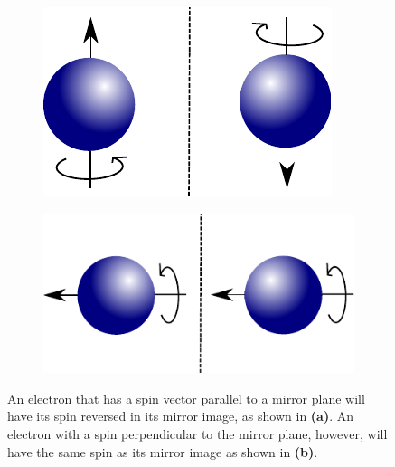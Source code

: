 \begin{figure}[h!]
\centering
\begin{subfigure}{.39\textwidth}
  \centering
  \includegraphics[width=1.0\linewidth]{Figures/UpDownSpinMirror}
  \caption{}
  \label{fig:UpDownSpinMirror}
\end{subfigure}%
\hspace{1cm}
\begin{subfigure}{.5\textwidth}
  \centering
  \includegraphics[width=1.0\linewidth]{Figures/LeftSpinMirror}
  \caption{}
  \label{fig:LeftSpinMirror}
\end{subfigure}
\caption{An electron that has a spin vector parallel to a mirror plane will have its spin reversed in its mirror image, as shown in \textbf{(a)}. An electron with a spin perpendicular to the mirror plane, however, will have the same spin as its mirror image as shown in \textbf{(b)}.}
\label{fig:SpinMirror}
\end{figure}
